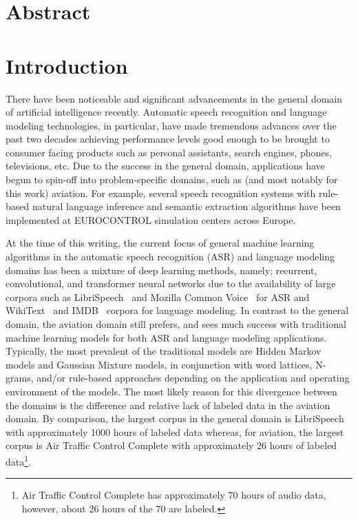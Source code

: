 \documentclass[12pt]{article}
\begin{document}
\section{Abstract}\label{sec:abstract}

\section{Introduction}\label{sec:introduction}
There have been noticeable and significant advancements in the general domain of artificial intelligence recently. Automatic speech recognition and
language modeling technologies, in particular, have made tremendous advances over the past two decades achieving performance levels good enough to
be brought to consumer facing products such as personal assistants, search engines, phones, televisions, etc. Due to the success in the general
domain, applications have begun to spin-off into problem-specific domains, such as (and most notably for this work) aviation. For example, several
speech recognition systems with rule-based natural language inference and semantic extraction algorithms have been implemented at EUROCONTROL
simulation centers across Europe.

At the time of this writing, the current focus of general machine learning algorithms in the automatic speech recognition (ASR) and language modeling
domains has been a mixture of deep learning methods, namely; recurrent, convolutional, and transformer neural networks due to the availability of
large corpora such as LibriSpeech~\cite{panayotov_librispeech_2015} and Mozilla Common Voice~\cite{ardila_common_2020} for ASR and
WikiText~\cite{merity_pointer_2016} and IMDB~\cite{maas_learning_2011} corpora for language modeling. In contrast to the general domain, the aviation
domain still prefers, and sees much success with traditional machine learning models for both ASR and language modeling applications. Typically, the
most prevalent of the traditional models are Hidden Markov models and Gaussian Mixture models, in conjunction with word lattices, N-grams, and/or
rule-based approaches depending on the application and operating environment of the models. The most likely reason for this divergence between the
domains is the difference and relative lack of labeled data in the aviation domain. By comparison, the largest corpus in the general domain is
LibriSpeech with approximately 1000 hours of labeled data whereas, for aviation, the largest corpus is Air Traffic Control Complete with approximately
26 hours of labeled data\footnote{Air Traffic Control Complete has approximately 70 hours of audio data, however, about 26 hours of the 70 are
    labeled.}.
\end{document}
